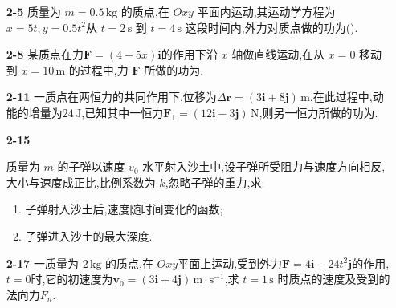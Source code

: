 \begin{enumerate}
	
	\item[\textbf{2-5}]
	质量为 \(m=0.5\,\mathrm{kg}\) 的质点,在 \(Oxy\) 平面内运动,其运动学方程为$x=5t,y=0.5t^2$从 \(t=2\,\mathrm{s}\) 到 \(t=4\,\mathrm{s}\) 这段时间内,外力对质点做的功为(\hspace{1em}).
	
	
	\vspace{5cm}

	\item[\textbf{2-8}]
	某质点在力$\boldsymbol{F}=(4+5x)\boldsymbol{i}$的作用下沿 \(x\) 轴做直线运动,在从 \(x=0\) 移动到 \(x=10\,\mathrm{m}\) 的过程中,力 \(\boldsymbol{F}\) 所做的功为\underline{\hspace{2cm}}.
	
	
	\vspace{5cm}

	\item[\textbf{2-11}]
	一质点在两恒力的共同作用下,位移为$\Delta\boldsymbol{r}=(3\boldsymbol{i}+8\boldsymbol{j})\,\mathrm{m}.$在此过程中,动能的增量为\(24\,\mathrm{J}\),已知其中一恒力$\boldsymbol{F}_1=(12\boldsymbol{i}-3\boldsymbol{j})\,\mathrm{N}$,则另一恒力所做的功为\underline{\hspace{2cm}}.
	
	\newpage


	\item[\textbf{2-15}]
	
	质量为 \(m\) 的子弹以速度 \(v_0\) 水平射入沙土中,设子弹所受阻力与速度方向相反,大小与速度成正比,比例系数为 \(k\),忽略子弹的重力,求:
	\begin{enumerate}
		\item 子弹射入沙土后,速度随时间变化的函数;
		\item 子弹进入沙土的最大深度.
	\end{enumerate}
	
	
	\vspace{5cm}

	\item[\textbf{2-17}]
	一质量为 \(2\,\mathrm{kg}\) 的质点,在 \(Oxy\)平面上运动,受到外力$\boldsymbol{F}=4\boldsymbol{i}-24t^2\boldsymbol{j}$的作用,\(t=0\)时,它的初速度为$\boldsymbol{v}_0=(3\boldsymbol{i}+4\boldsymbol{j})\,\mathrm{m\cdot s^{-1}}$,求 \(t=1\,\mathrm{s}\) 时质点的速度及受到的法向力$F_n$.
	

\end{enumerate}
